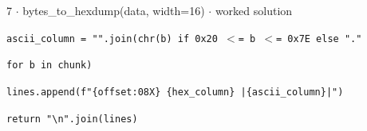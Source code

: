 \documentclass[11pt]{article}
\begin{document}
\begin{keepsection}
\begin{workedbox}{7 \ensuremath{\cdot} bytes\_to\_hexdump(data, width=16) \ensuremath{\cdot} worked solution}
\begin{enumerate}
\begin{tcolorbox}[colback=Paperblue,colframe=Paperblue,boxrule=0pt,arc=0pt,left=7pt,right=7pt,top=5pt,bottom=5pt]
\noindent\hspace*{3em}\texttt{ascii\_column = "".join(chr(b) if 0x20 \ensuremath{<}= b \ensuremath{<}= 0x7E else "."}\par
\noindent\hspace*{13em}\texttt{for b in chunk)}\par
\noindent\hspace*{3em}\texttt{lines.append(f"\{offset:08X\} \{hex\_column\} |\{ascii\_column\}|")}\par
\noindent\hspace*{1em}\texttt{return "\textbackslash{}n".join(lines)}\par
\end{tcolorbox}
\end{enumerate}
\end{workedbox}

\end{keepsection}
\end{document}
